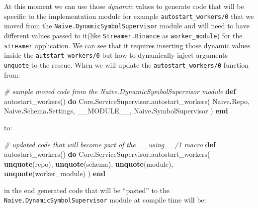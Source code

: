 \documentclass[
]{book}
\newenvironment{Shaded}{\begin{snugshade}}{\end{snugshade}}
\newcommand{\CommentTok}[1]{\textcolor[rgb]{0.56,0.35,0.01}{\textit{#1}}}
\newcommand{\ConstantTok}[1]{\textcolor[rgb]{0.00,0.00,0.00}{#1}}
\newcommand{\KeywordTok}[1]{\textcolor[rgb]{0.13,0.29,0.53}{\textbf{#1}}}
\newcommand{\NormalTok}[1]{#1}
\newcommand{\OperatorTok}[1]{\textcolor[rgb]{0.81,0.36,0.00}{\textbf{#1}}}
\begin{document}
At this moment we can use those \emph{dynamic} values to generate code that will be specific to the implementation module for example \texttt{autostart\_workers/0} that we moved from the \texttt{Naive.DynamicSymbolSupervisor} module and will need to have different values passed to it(like \texttt{Streamer.Binance} as \texttt{worker\_module}) for the \texttt{streamer} application. We can see that it requires inserting those dynamic values inside the \texttt{autstart\_workers/0} but how to dynamically inject arguments - \texttt{unquote} to the rescue. When we will update the \texttt{autostart\_workers/0} function from:

\begin{Shaded}
\begin{Highlighting}[]
      \CommentTok{\# sample moved code from the \textasciigrave{}Naive.DynamicSymbolSupervisor\textasciigrave{} module}
      \KeywordTok{def}\NormalTok{ autostart\_workers() }\KeywordTok{do}
          \ConstantTok{Core}\OperatorTok{.}\ConstantTok{ServiceSupervisor}\OperatorTok{.}\NormalTok{autostart\_workers(}
          \ConstantTok{Naive}\OperatorTok{.}\ConstantTok{Repo}\NormalTok{,}
          \ConstantTok{Naive}\OperatorTok{.}\ConstantTok{Schema}\OperatorTok{.}\ConstantTok{Settings}\NormalTok{,}
          \ConstantTok{\_\_MODULE\_\_}\NormalTok{,}
          \ConstantTok{Naive}\OperatorTok{.}\ConstantTok{SymbolSupervisor}
\NormalTok{        )}
      \KeywordTok{end}
\end{Highlighting}
\end{Shaded}

to:

\begin{Shaded}
\begin{Highlighting}[]
      \CommentTok{\# updated code that will become part of the \textasciigrave{}\_\_using\_\_/1\textasciigrave{} macro}
      \KeywordTok{def}\NormalTok{ autostart\_workers() }\KeywordTok{do}
        \ConstantTok{Core}\OperatorTok{.}\ConstantTok{ServiceSupervisor}\OperatorTok{.}\NormalTok{autostart\_workers(}
          \KeywordTok{unquote}\NormalTok{(repo),}
          \KeywordTok{unquote}\NormalTok{(schema),}
          \KeywordTok{unquote}\NormalTok{(module),}
          \KeywordTok{unquote}\NormalTok{(worker\_module)}
\NormalTok{        )}
      \KeywordTok{end}
\end{Highlighting}
\end{Shaded}

in the end generated code that will be ``pasted'' to the \texttt{Naive.DynamicSymbolSupervisor} module at compile time will be:
\end{document}
